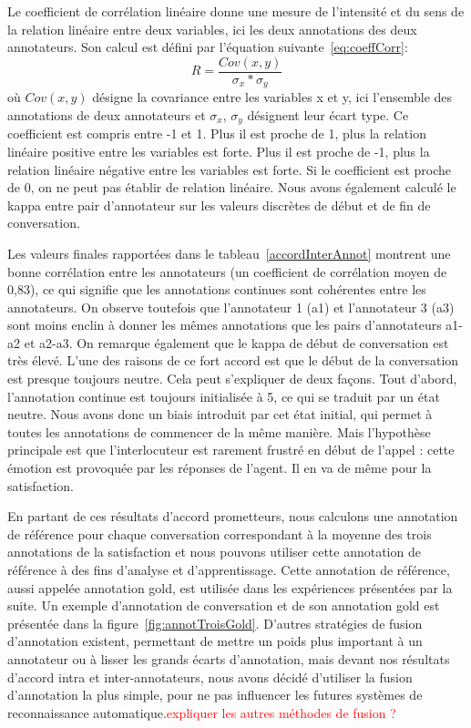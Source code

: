 Le coefficient de corrélation linéaire donne une mesure de l'intensité et du sens de la relation linéaire entre deux variables, ici les deux annotations des deux annotateurs. Son calcul est défini par l'équation suivante~\ref{eq:coeffCorr}:
\begin{equation}
  R = \dfrac{Cov(x,y)}{\sigma_x*\sigma_y}
  \label{eq:coeffCorr}
\end{equation}
où $Cov(x,y)$ désigne la covariance entre les variables x et y, ici l'ensemble des annotations de deux annotateurs et $\sigma_x$, $\sigma_y$ désignent leur écart type.
Ce coefficient est compris entre -1 et 1. Plus il est proche de 1, plus la relation linéaire positive entre les variables est forte. Plus il est proche de -1, plus la relation linéaire négative entre les variables est forte. Si le coefficient est proche de 0, on ne peut pas établir de relation linéaire.
Nous avons également calculé le kappa entre pair d'annotateur sur les valeurs discrètes de début et de fin de conversation.


Les valeurs finales rapportées dans le tableau~\ref{accordInterAnnot} montrent une bonne corrélation entre les annotateurs (un coefficient de corrélation moyen de 0,83), ce qui signifie que les annotations continues sont cohérentes entre les annotateurs.
On observe toutefois que l'annotateur 1 (a1) et l'annotateur 3 (a3) sont moins enclin à donner les mêmes annotations que les pairs d'annotateurs a1-a2 et a2-a3. On remarque également que le kappa de début de conversation est très élevé. L’une des raisons de ce fort accord est que le début de la conversation est presque toujours neutre. Cela peut s’expliquer de deux façons. Tout d’abord, l’annotation continue est toujours initialisée à 5, ce qui se traduit par un état neutre. Nous avons donc un biais introduit par cet état initial, qui permet à toutes les annotations de commencer de la même manière.
Mais l’hypothèse principale est que l’interlocuteur est rarement frustré en début de l’appel : cette émotion est provoquée par les réponses de l’agent. Il en va de même pour la satisfaction.


En partant de ces résultats d’accord prometteurs, nous calculons une annotation de référence pour chaque conversation correspondant à la moyenne des trois annotations de la satisfaction et nous pouvons utiliser cette annotation de référence à des fins d’analyse et d’apprentissage. Cette annotation de référence, aussi appelée annotation gold, est utilisée dans les expériences présentées par la suite. Un exemple d'annotation de conversation et de son annotation gold est présentée dans la figure~\ref{fig:annotTroisGold}.
D'autres stratégies de fusion d'annotation existent, permettant de mettre un poids plus important à un annotateur ou à lisser les grands écarts d'annotation, mais devant nos résultats d'accord intra et inter-annotateurs, nous avons décidé d'utiliser la fusion d'annotation la plus simple, pour ne pas influencer les futures systèmes de reconnaissance automatique.\textcolor{red}{expliquer les autres méthodes de fusion ?}

